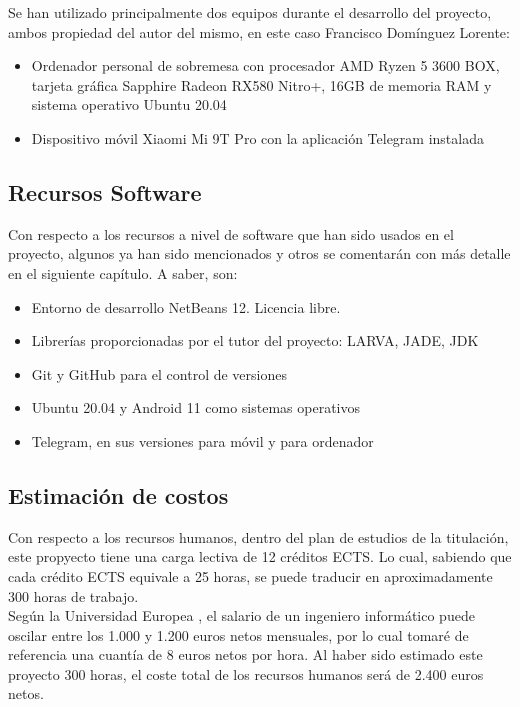 Se han utilizado principalmente dos equipos durante el desarrollo del proyecto, ambos propiedad del autor del mismo, en este caso Francisco Domínguez Lorente:\\

\begin{itemize}
	\item Ordenador personal de sobremesa con procesador AMD Ryzen 5 3600 BOX, tarjeta gráfica Sapphire Radeon RX580 Nitro+, 16GB de memoria RAM y sistema operativo Ubuntu 20.04
	\item Dispositivo móvil Xiaomi Mi 9T Pro con la aplicación Telegram instalada
\end{itemize}

\subsection{Recursos Software}

Con respecto a los recursos a nivel de software que han sido usados en el proyecto, algunos ya han sido mencionados y otros se comentarán con más detalle en el siguiente capítulo. A saber, son:\\

\begin{itemize}
	\item Entorno de desarrollo NetBeans 12. Licencia libre.
	\item Librerías proporcionadas por el tutor del proyecto: LARVA, JADE, JDK
	\item Git y GitHub para el control de versiones
	\item Ubuntu 20.04 y Android 11 como sistemas operativos
	\item Telegram, en sus versiones para móvil y para ordenador
\end{itemize}

\subsection{Estimación de costos}

Con respecto a los recursos humanos, dentro del plan de estudios de la titulación, este propyecto tiene una carga lectiva de 12 créditos ECTS. Lo cual, sabiendo que cada crédito ECTS equivale a 25 horas, se puede traducir en aproximadamente 300 horas de trabajo.\\

Según la Universidad Europea \cite{universidad-europea-2021}, el salario de un ingeniero informático puede oscilar entre los 1.000 y 1.200 euros netos mensuales, por lo cual tomaré de referencia una cuantía de 8 euros netos por hora. Al haber sido estimado este proyecto 300 horas, el coste total de los recursos humanos será de 2.400 euros netos.\\

